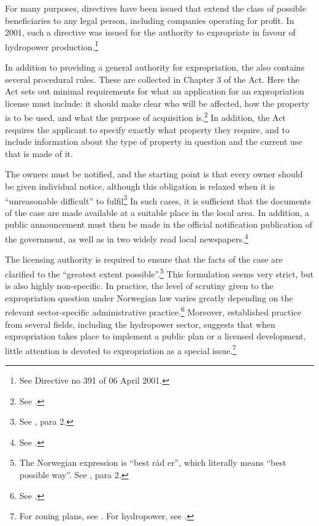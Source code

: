 For many purposes, directives have been issued that extend the class of possible beneficiaries to any legal person, including companies operating for profit. In 2001, such a directive was issued for the authority to expropriate in favour of hydropower production.\footnote{See Directive no 391 of 06 April 2001.} 

In addition to providing a general authority for expropriation, the \cite{ea59} also contains several procedural rules. These are collected in Chapter 3 of the Act. Here the Act sets out minimal requirements for what an application for an expropriation license must include: it should make clear who will be affected, how the property is to be used, and what the purpose of acquisition is.\footnote{See \cite[11]{ea59}.} In addition, the Act requires the applicant to specify exactly what property they require, and to include information about the type of property in question and the current use that is made of it.

The owners must be notified, and the starting point is that every owner should be given individual notice, although this obligation is relaxed when it is ``unreasonable difficult'' to fulfil\footnote{See \cite[12]{ea59}, para 2.} In such cases, it is sufficient that the documents of the case are made available at a suitable place in the local area. In addition, a public announcement must then  be made in the official notification publication of the government, as well as in two widely read local newspapers.\footnote{See \cite[12]{ea59}.}

The licensing authority is required to ensure that the facts of the case are clarified to the ``greatest extent possible''.\footnote{The Norwegian expression is ``best råd er'', which literally means ``best possible way''. See \cite[12]{ea59}, para 2.} This formulation seems very strict, but is also highly non-specific. In practice, the level of scrutiny given to the expropriation question under Norwegian law varies greatly depending on the relevant sector-specific administrative practice.\footnote{See \cite[380-381]{dyrkolbotn15}.} Moreover, established practice from several fields, including the hydropower sector, suggests that when expropriation takes place to implement a public plan or a licensed development, little attention is devoted to expropriation as a special issue.\footnote{For zoning plans, see \cite{namsos98,bo99}. For hydropower, see \cite{jorpeland11}.}

